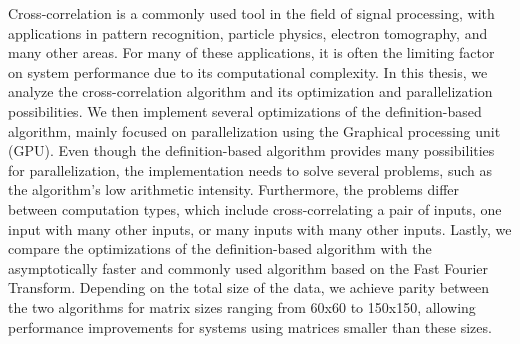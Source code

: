 \documentclass[12pt]{report}
\begin{document}

Cross-correlation is a commonly used tool in the field of signal processing, with applications in pattern recognition, particle physics, electron tomography, and many other areas. For many of these applications, it is often the limiting factor on system performance due to its computational complexity. In this thesis, we analyze the cross-correlation algorithm and its optimization and parallelization possibilities. We then implement several optimizations of the definition-based algorithm, mainly focused on parallelization using the Graphical processing unit (GPU). Even though the definition-based algorithm provides many possibilities for parallelization, the implementation needs to solve several problems, such as the algorithm's low arithmetic intensity. Furthermore, the problems differ between computation types, which include cross-correlating a pair of inputs, one input with many other inputs, or many inputs with many other inputs. Lastly, we compare the optimizations of the definition-based algorithm with the asymptotically faster and commonly used algorithm based on the Fast Fourier Transform. Depending on the total size of the data, we achieve parity between the two algorithms for matrix sizes ranging from 60x60 to 150x150, allowing performance improvements for systems using matrices smaller than these sizes.
\end{document}
